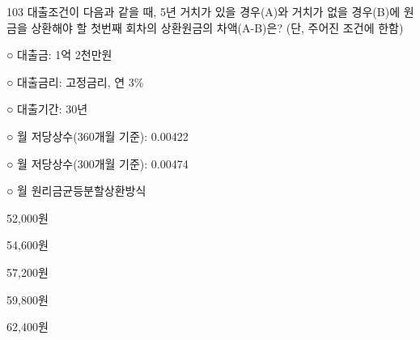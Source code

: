 \begin{question}{103}
대출조건이 다음과 같을 때, 5년 거치가 있을 경우(A)와 거치가 없을 경우(B)에 원금을 상환해야 할 첫번째 회차의 상환원금의 차액(A-B)은? (단, 주어진 조건에 한함)
\begin{framedtext}
○ 대출금: 1억 2천만원 \par
○ 대출금리: 고정금리, 연 3\% \par
○ 대출기간: 30년 \par
○ 월 저당상수(360개월 기준): 0.00422 \par
○ 월 저당상수(300개월 기준): 0.00474 \par
○ 월 원리금균등분할상환방식 \par
\end{framedtext}
\begin{choices}
  \item 52,000원
  \item 54,600원
  \item 57,200원
  \item 59,800원
  \item 62,400원
\end{choices}
\end{question}
